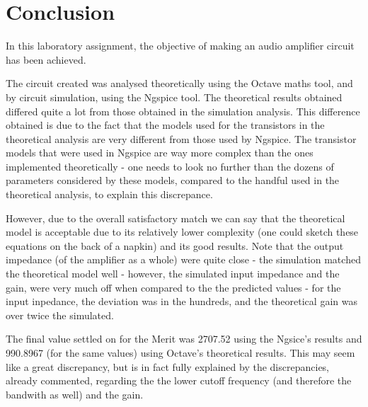 \section{Conclusion}
\label{sec:conclusion}

In this laboratory assignment, the objective of making an audio amplifier circuit has been achieved.\par
The circuit created was analysed theoretically using the Octave maths tool, and by circuit simulation, using the
Ngspice tool. The theoretical results obtained differed quite a lot from those obtained in the simulation analysis. This difference obtained is due to the fact that the models used for the transistors in the theoretical analysis are very different from those used by Ngspice. The transistor models that were used in Ngspice are way more complex than the ones implemented theoretically - one needs to look no further than the dozens of parameters considered by these models, compared to the handful used in the theoretical analysis, to explain this discrepance. 

However, due to the overall satisfactory match we can say that the theoretical model is acceptable due to its relatively lower complexity (one could sketch these equations on the back of a napkin) and its good results. Note that the output impedance (of the amplifier as a whole) were quite close - the simulation matched the theoretical model well - however, the simulated input impedance and the gain, were very much off when compared to the the predicted values - for the input inpedance, the deviation was in the hundreds, and the theoretical gain was over twice the simulated.\par
The final value settled on for the Merit was 2707.52 using the Ngsice's results and 990.8967 (for the same values) using Octave's theoretical results. This may seem like a great discrepancy, but is in fact fully explained by the discrepancies, already commented, regarding the the lower cutoff frequency (and therefore the bandwith as well) and the gain.


